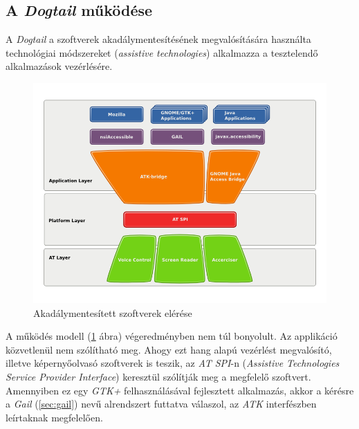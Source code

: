 \subsection{A \textit{Dogtail} működése}

A \textit{Dogtail} a szoftverek akadálymentesítésének megvalósítására használta technológiai módszereket (\textit{assistive technologies}) alkalmazza a tesztelendő alkalmazások vezérlésére.

\begin{figure}[h]
\begin{center}
\includegraphics[height=0.5\linewidth]{images/a11y.png}
\caption{Akadálymentesített szoftverek elérése}
\label{fig:a11y}
\end{center}
\end{figure}

A működés modell (\ref{fig:a11y} ábra) végeredményben nem túl bonyolult. Az applikáció közvetlenül nem szólítható meg. Ahogy ezt hang alapú vezérlést megvalósító, illetve képernyőolvasó szoftverek is teszik, az \textit{AT SPI}-n (\textit{Assistive Technologies Service Provider Interface}) keresztül szólítják meg a megfelelő szoftvert. Amennyiben ez egy \textit{GTK+} felhasználásával fejlesztett alkalmazás, akkor a kérésre a \textit{Gail} (\ref{sec:gail}) nevű alrendszert futtatva válaszol, az \textit{ATK} interfészben leírtaknak megfelelően.
